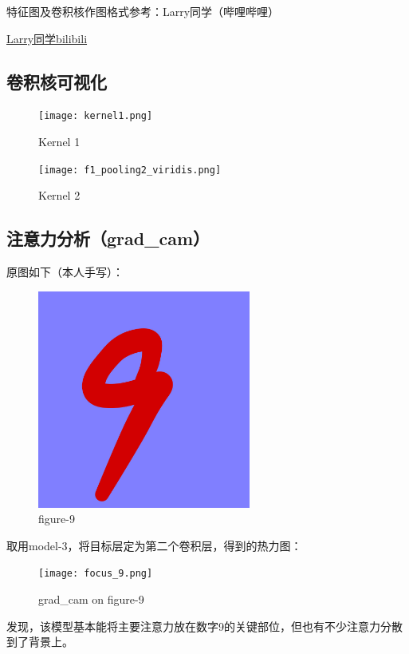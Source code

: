 \documentclass[12pt, a4paper, oneside]{ctexart}
\begin{document}
特征图及卷积核作图格式参考：Larry同学（哔哩哔哩）

\href{https://www.bilibili.com/video/BV17i421U73P?vd_source=c14e6c30a308a6303f3a1b9c65140798}{Larry同学bilibili}

\subsection{卷积核可视化}
\begin{figure}[H]  
    \begin{minipage}[H]{0.5\linewidth} %
            \centering
            \texttt{[image: kernel1.png]}
            \caption{Kernel 1}
     \end{minipage}
     \begin{minipage}[H]{0.5\linewidth} %
         \hspace{2mm}%
         \texttt{[image: f1\_pooling2\_viridis.png]}
         \caption{Kernel 2}
      \end{minipage}
\end{figure}


\subsection{注意力分析（grad\_cam）}
原图如下（本人手写）：
\begin{figure}[H]
    \centering
    \includegraphics[width=7cm]{test_9.jpg}
    \caption{figure-9}
\end{figure}
取用model-3，将目标层定为第二个卷积层，得到的热力图：
\begin{figure}[H]
    \centering
    \texttt{[image: focus\_9.png]}
    \caption{grad\_cam on figure-9}
\end{figure}

发现，该模型基本能将主要注意力放在数字9的关键部位，但也有不少注意力分散到了背景上。
\end{document}
